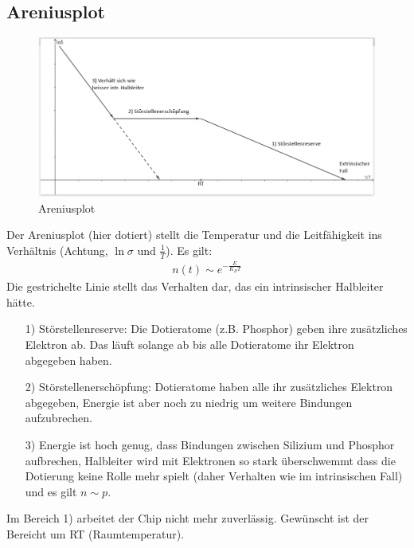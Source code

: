 \documentclass[12pt,a4paper]{report}%
\numberwithin{equation}{section}
\numberwithin{equation}{subsection}
\begin{document}
	\subsection{Areniusplot}
	\begin{figure}[H] 
	  \centering
	  \captionsetup{justification=centering}
	  \includegraphics[width=0.9\linewidth]{Areniusplot.png}
	  \caption{Areniusplot}
	  \label{fig:areniusplot}
  \end{figure}
  Der Areniusplot (hier dotiert) stellt die Temperatur und die Leitfähigkeit ins Verhältnis (Achtung, $\ln \sigma$ und $\frac{1}{T}$). Es gilt:
  \begin{align*}
    n(t) \sim \displaystyle e^{-\displaystyle\frac{E}{K_B T}}
  \end{align*}
  Die gestrichelte Linie stellt das Verhalten dar, das ein intrinsischer Halbleiter hätte.
  \begin{itemize}
    \item[1) ] Störstellenreserve: Die Dotieratome (z.B. Phosphor) geben ihre zusätzliches Elektron ab. Das läuft solange ab bis alle Dotieratome ihr Elektron abgegeben haben.
    \item[2) ] Störstellenerschöpfung: Dotieratome haben alle ihr zusätzliches Elektron abgegeben, Energie ist aber noch zu niedrig um weitere Bindungen aufzubrechen.
    \item[3) ] Energie ist hoch genug, dass Bindungen zwischen Silizium und Phosphor aufbrechen, Halbleiter wird mit Elektronen so stark überschwemmt dass die Dotierung keine Rolle mehr spielt (daher Verhalten wie im intrinsischen Fall) und es gilt $n\sim p$.
  \end{itemize}
  Im Bereich 1) arbeitet der Chip nicht mehr zuverlässig. Gewünscht ist der Bereicht um RT (Raumtemperatur). 
\end{document}
